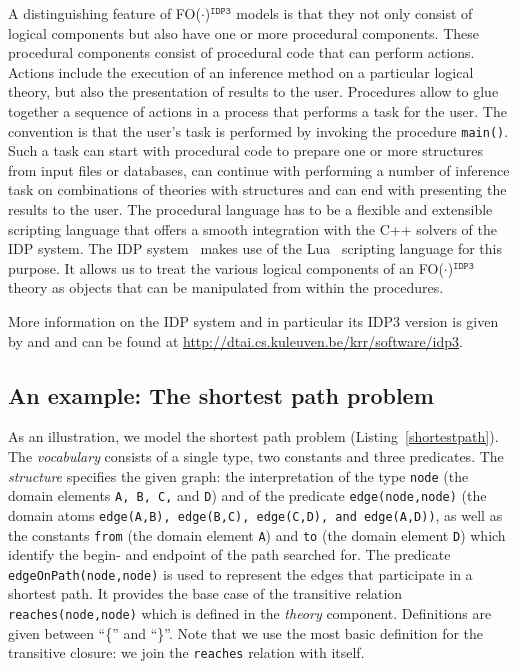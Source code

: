 \documentclass{tlp}
\newcommand{\idp}{{\sc IDP}\xspace}
\newcommand{\idpdrie}{{\sc IDP3}\xspace}
\newcommand{\fodotidp}{{\sc FO($\cdot$)$^{\mathtt{IDP3}}$}\xspace}
\renewcommand{\|}{\ensuremath{\,|\,}}
\renewcommand{\|}{\,|\,}
\newcommand{\idpcode}[1]{\lstinline{#1}}
\begin{document}
A distinguishing feature of \fodotidp models is that they not only
consist of logical components but also have one or more procedural
components. These procedural components consist of procedural code
that can perform actions. Actions include the execution of an
inference method on a particular logical theory, but also the
presentation of results to the user. Procedures allow to glue together
a sequence of actions in a process that performs a task for the
user. The convention is that the user's task is performed by invoking
the procedure \idpcode{main()}. Such a task can start with procedural
code to prepare one or more structures from input files or databases,
can continue with performing a number of inference task on
combinations of theories with structures and can end with presenting
the results to the user. The procedural language has to be a flexible
and extensible scripting language that offers a smooth integration
with the C++ solvers of the \idp system. The IDP
system~\cite{inap/DePooterWD11} makes use of the
Lua~\cite{SPE/IerusalimschyFC96} scripting language for this
purpose. It allows us to treat the various logical components of an
\fodotidp theory as objects that can be manipulated from within the
procedures.

More information on the \idp system and in particular its \idpdrie
version is given by  and
 and can be found at
\url{http://dtai.cs.kuleuven.be/krr/software/idp3}.

\subsection{An example: The shortest path problem}\label{sec:shrtpth}

As an illustration, we model the shortest path problem
(Listing~\ref{shortestpath}).  The {\em vocabulary} consists of a
single type, two constants and three predicates. The {\em structure}
specifies the given graph: the interpretation of the type
\texttt{node} (the domain elements \texttt{A, B, C,} and \texttt{D})
and of the predicate \texttt{edge(node,node)} (the domain atoms
\texttt{edge(A,B), edge(B,C), edge(C,D), and \texttt{edge(A,D)})}, as
well as the constants \texttt{from} (the domain element \texttt{A})
and \texttt{to} (the domain element \texttt{D}) which identify the
begin- and endpoint of the path searched for. The predicate
\texttt{edgeOnPath(node,node)} is used to represent the edges that
participate in a shortest path. It provides the base case of the
transitive relation \texttt{reaches(node,node)} which is defined in
the {\em theory} component. Definitions are given between ``\{'' and
``\}''.  Note that we use the most basic definition for the transitive
closure: we join the \texttt{reaches} relation with itself.
\end{document}
